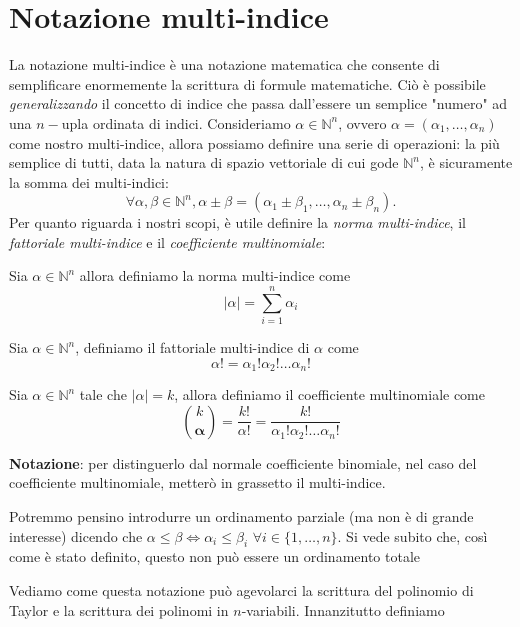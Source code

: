 \chapter{Notazione multi-indice}
\pagestyle{plain}
\thispagestyle{empty}
\pagestyle{fancy}
La notazione multi-indice è una notazione matematica che consente di semplificare enormemente la scrittura di formule matematiche. Ciò è possibile \emph{generalizzando} il concetto di indice che passa dall'essere
un semplice "numero" ad una $n-$upla ordinata di indici. Consideriamo $\alpha \in \mathbb{N}^n$, ovvero $\alpha = (\alpha_1, \ldots, \alpha_n)$ come nostro multi-indice, allora possiamo definire una serie di operazioni: la più semplice di tutti, data la natura di spazio vettoriale di cui gode $\mathbb{N}^n$, è sicuramente la somma dei multi-indici:
$$
\forall \alpha, \beta \in \mathbb{N}^n, \alpha \pm \beta = (\alpha_1 \pm \beta_1, \ldots, \alpha_n \pm \beta_n).
$$
Per quanto riguarda i nostri scopi, è utile definire la \emph{norma multi-indice}, il \emph{fattoriale multi-indice} e il \emph{coefficiente multinomiale}:
\begin{definition}
	Sia $\alpha \in \mathbb{N}^n$ allora definiamo la norma multi-indice come
	$$
	|\alpha| = \sum_{i=1}^n \alpha_i
	$$
\end{definition}
\begin{definition}
	Sia $\alpha \in \mathbb{N}^n$, definiamo il fattoriale multi-indice di $\alpha$ come
	$$
	\alpha! = \alpha_1 ! \alpha_2 ! \ldots \alpha_n !
	$$
\end{definition}
\begin{definition}
	Sia $\alpha \in \mathbb{N}^n$ tale che $|\alpha| = k$, allora definiamo il coefficiente multinomiale come
	$$
	\binom{k}{\bm{\alpha}} = \frac{k!}{\alpha!} = \frac{k!}{\alpha_1 ! \alpha_2 ! \ldots \alpha_n !}
	$$
\end{definition}
\textbf{Notazione}: per distinguerlo dal normale coefficiente binomiale, nel caso del coefficiente multinomiale, metterò in grassetto il multi-indice.
\begin{remark}
	Potremmo pensino introdurre un ordinamento parziale (ma non è di grande interesse) dicendo che $\alpha \leq \beta \iff \alpha_i \leq \beta_i \, \, \forall i \in \{1, \ldots, n \}$. Si vede subito che, così come è stato definito, questo non può essere un ordinamento totale
\end{remark}
Vediamo come questa notazione può agevolarci la scrittura del polinomio di Taylor e la scrittura dei polinomi in $n$-variabili. Innanzitutto definiamo
